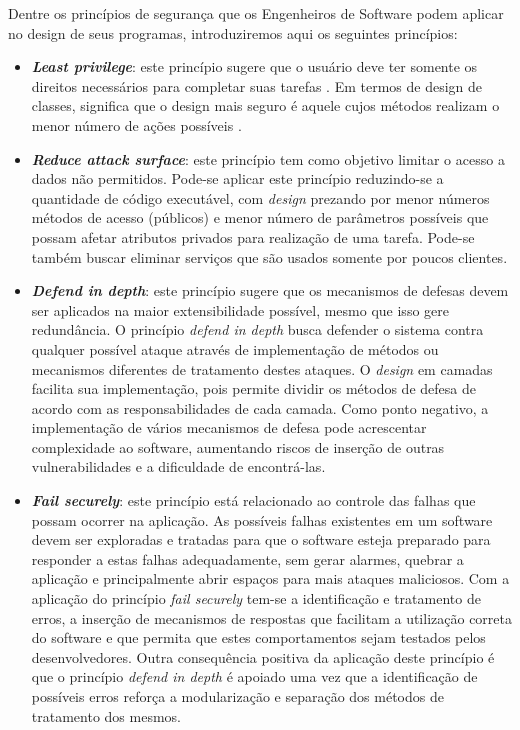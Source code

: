 %

Dentre os princípios de segurança que os Engenheiros de Software podem aplicar no design de seus programas, introduziremos aqui os seguintes princípios:

\begin{itemize}
\item \textbf{\emph{Least privilege}}: este princípio sugere que o usuário deve ter somente os direitos necessários para completar suas tarefas \cite{bishop2003}. Em termos de design de classes, significa que o design mais seguro é aquele cujos métodos realizam o menor número de ações possíveis \cite{a1lshammari2009}.
\item \textbf{\emph{Reduce attack surface}}: este princípio tem como objetivo limitar o acesso a dados não permitidos. Pode-se aplicar este princípio reduzindo-se a quantidade de código executável, com \emph{design} prezando por menor números métodos de acesso (públicos) e menor número de parâmetros possíveis que possam afetar atributos privados para realização de uma tarefa. Pode-se também buscar eliminar serviços que são usados somente por poucos clientes.
\item \textbf{\emph{Defend in depth}}: este princípio sugere que os mecanismos de defesas devem ser aplicados na maior extensibilidade possível, mesmo que isso gere redundância. O princípio \emph{defend in depth} busca defender o sistema contra qualquer possível ataque através de implementação de métodos ou mecanismos diferentes de tratamento destes ataques. O \emph{design} em camadas facilita sua implementação, pois permite dividir os métodos de defesa de acordo com as responsabilidades de cada camada. Como ponto negativo, a implementação de vários mecanismos de defesa pode acrescentar complexidade ao software, aumentando riscos de inserção de outras vulnerabilidades e a dificuldade de encontrá-las.
\item \textbf{\emph{Fail securely}}: este princípio está relacionado ao controle das falhas que possam ocorrer na aplicação. As possíveis falhas existentes em um software devem ser exploradas e tratadas para que o software esteja preparado para responder a estas falhas adequadamente, sem gerar alarmes, quebrar a aplicação e principalmente abrir espaços para mais ataques maliciosos. Com a aplicação do princípio \emph{fail securely} tem-se a identificação e tratamento de erros, a inserção de mecanismos de respostas que facilitam a utilização correta do software e que permita que estes comportamentos sejam testados pelos desenvolvedores. Outra consequência positiva da aplicação deste princípio é que o princípio \emph{defend in depth} é apoiado uma vez que a identificação de possíveis erros reforça a modularização e separação dos métodos de tratamento dos mesmos.

\end{itemize}
